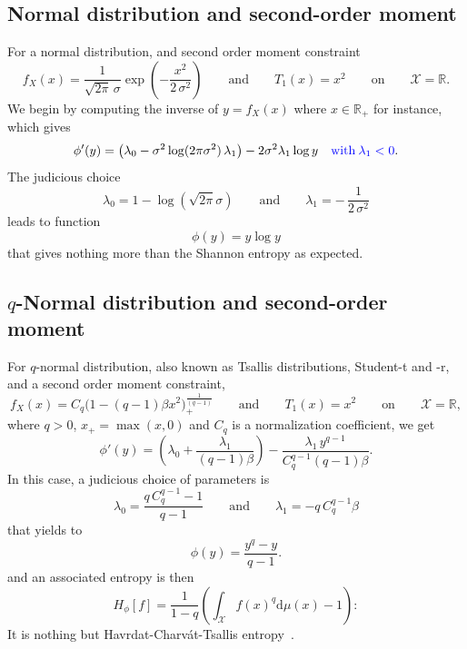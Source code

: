 \documentclass[english,sort&compress]{elsarticle}
\theoremstyle{definition}
\theoremstyle{plain}
\theoremstyle{plain}
\def\dmu{\mathrm{d}\mu}
\def\Rset{\mathbb{R}}
\def\X{\mathcal{X}}
\begin{document}

\subsection{Normal distribution and second-order moment}
\label{subsec:NormalSecondOrder}

For a normal distribution, and second order moment constraint 
%
\[
f_X(x)  = \frac{1}{\sqrt{2\pi} \,\sigma}  \exp\left( -\frac{x^2}{2  \, \sigma^2}
\right)  \qquad \mbox{and}  \qquad T_1(x)  = x^2  \qquad \mbox{on}  \qquad  \X =
\Rset.
\]
%
We begin  by computing the  inverse of  $y = f_X(x)$  where $x \in  \Rset_+$ for
instance, which gives
%
\[
\phi'(y) = \left( \lambda_0 - \sigma^2 \log(2 \pi \sigma^2) \, \lambda_1 \right)
- 2 \sigma^2 \lambda_1 \log y \quad {\color{blue} \mbox{with} \: \lambda_1 < 0}.
\]
%
The judicious choice
%
\[
\lambda_0 = 1 - \log( \sqrt{2\pi}  \sigma ) \qquad \mbox{and} \qquad \lambda_1 =
- \, \frac{1}{2 \, \sigma^2}
\]
%
leads to function
%
\[
\phi(y) = y \log y
\]
%
that gives nothing more than the Shannon entropy as expected.



\subsection{$q$-Normal distribution and second-order moment}
\label{subsec:qNormalSecondOrder}

For $q$-normal distribution, also  known as Tsallis distributions, Student-t and
-r, and a second order moment constraint,
%
\[
f_X(x)  = C_q  \Big( 1  - (q-1)  \beta x^2  \Big)_{\!+}^{\frac{1}{(q-1)}} \qquad
\mbox{and} \qquad T_1(x) = x^2 \qquad \mbox{on} \qquad \X = \Rset,
\]
%
where $q  > 0$, $x_+ = \max(x,0)$  and $C_q$ is a  normalization coefficient, we
get
%
\[
\phi'(y)  =   \left(  \lambda_0   +  \frac{\lambda_1}{(q-1)  \beta}   \right)  -
\frac{\lambda_1 \, y^{q-1}}{C_q^{q-1} (q-1) \beta}.
\]
%
In this case, a judicious choice of parameters is
%
\[
\lambda_0 = \frac{q \, C_q^{q-1}  - 1}{q-1} \qquad \mbox{and} \qquad \lambda_1 =
-q \, C_q^{q-1} \beta
\]
%
that yields to 
%
\[
\phi(y) = \frac{y^q-y}{q-1}.
\]
%
and an associated entropy is then 
%
\[
H_\phi[f] = \frac{1}{1-q} \left( \int_\X f(x)^q \dmu(x) - 1 \right):
\]
%
It  is  nothing  but  Havrdat-Charv\'at-Tsallis  entropy~\cite{HavCha67,  Dar70,
  Tsa88, CosHer03}.
\end{document}
